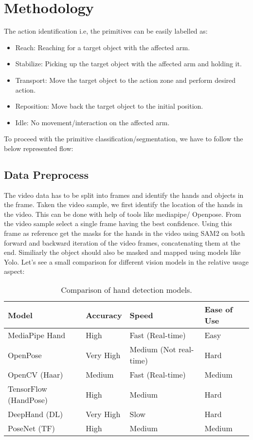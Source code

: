 \documentclass[conference]{IEEEtran}
\begin{document}
\section{Methodology}
    The action identification i.e, the primitives can be easily labelled as:
    \begin{itemize}
        \item Reach: Reaching for a target object with the affected arm. 
        \item Stabilize: Picking up the target object with the affected arm and holding it.
        \item Transport: Move the target object to the action zone and perform desired action.
        \item Reposition: Move back the target object to the initial position.
        \item Idle: No movement/interaction on the affected arm.
    \end{itemize}
    To proceed with the primitive classification/segmentation, we have to follow the below represented flow:

\subsection{Data Preprocess}
The video data has to be split into frames and identify the hands and objects in the frame. Taken the video sample, we first identify the location of the hands in the video.
This can be done with help of tools like mediapipe/ Openpose. From the video sample select a single frame having the best confidence. Using this frame as reference get the masks for the hands in the video using SAM2 on both forward and backward iteration of the video frames, concatenating them at the end.
Similiarly the object should also be masked and mapped using models like Yolo.
Let's see a small comparison for different vision models in the relative usage aspect:
\begin{table}[h!]
    \centering
    \begin{tabular}{|l|l|l|l|}
    \hline
    \textbf{Model} & \textbf{Accuracy} & \textbf{Speed} & \textbf{Ease of Use} \\ \hline
    MediaPipe Hand & High & Fast (Real-time) & Easy  \\ \hline
    OpenPose & Very High & Medium (Not real-time) & Hard \\ \hline
    OpenCV (Haar) & Medium & Fast (Real-time) & Medium \\ \hline
    TensorFlow (HandPose) & High & Medium & Hard  \\ \hline
    DeepHand (DL) & Very High & Slow & Hard \\ \hline
    PoseNet (TF) & High & Medium & Medium  \\ \hline
    \end{tabular}
    \caption{Comparison of hand detection models.}
\end{table}
\end{document}
